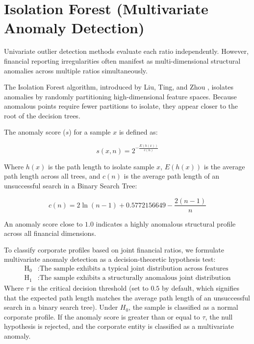 \section{Isolation Forest (Multivariate Anomaly Detection)}
Univariate outlier detection methods evaluate each ratio independently. However, financial reporting irregularities often manifest as multi-dimensional structural anomalies across multiple ratios simultaneously. 

The Isolation Forest algorithm, introduced by Liu, Ting, and Zhou \cite{liu2008isolation}, isolates anomalies by randomly partitioning high-dimensional feature spaces. Because anomalous points require fewer partitions to isolate, they appear closer to the root of the decision trees.

The anomaly score ($s$) for a sample $x$ is defined as:

\begin{equation}
    s(x, n) = 2^{-\frac{E(h(x))}{c(n)}}
\end{equation}

Where $h(x)$ is the path length to isolate sample $x$, $E(h(x))$ is the average path length across all trees, and $c(n)$ is the average path length of an unsuccessful search in a Binary Search Tree:

\begin{equation}
    c(n) = 2\ln(n - 1) + 0.5772156649 - \frac{2(n - 1)}{n}
\end{equation}

An anomaly score close to $1.0$ indicates a highly anomalous structural profile across all financial dimensions. 

To classify corporate profiles based on joint financial ratios, we formulate multivariate anomaly detection as a decision-theoretic hypothesis test:
\begin{align}
    \text{H}_0 &: \text{The sample exhibits a typical joint distribution across features} \\
    \text{H}_1 &: \text{The sample exhibits a structurally anomalous joint distribution}
\end{align}
Where $\tau$ is the critical decision threshold (set to $0.5$ by default, which signifies that the expected path length matches the average path length of an unsuccessful search in a binary search tree). Under $H_0$, the sample is classified as a normal corporate profile. If the anomaly score is greater than or equal to $\tau$, the null hypothesis is rejected, and the corporate entity is classified as a multivariate anomaly.

